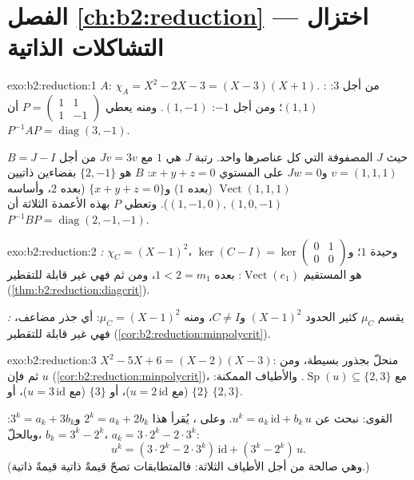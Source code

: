 \section*{الفصل \ref{ch:b2:reduction} --- اختزال التشاكلات الذاتية}

\begin{solution}{exo:b2:reduction:1}
$A$: $\chi_A = X^2 - 2X - 3 = (X - 3)(X + 1)$. : من أجل
$3$: $(1,1)$؛ ومن أجل $-1$: $(1,-1)$. ومنه يعطي $P = \begin{pmatrix} 1 & 1\\ 1
& -1\end{pmatrix}$ أن $P^{-1}AP = \operatorname{diag}(3, -1)$.

$B = J - I$ حيث $J$ المصفوفة التي كل عناصرها واحد. رتبة $J$ هي $1$ مع
$Jv = 3v$ من أجل $v = (1,1,1)$ و$Jw = 0$ على المستوي $x + y + z =
0$:  $B$ هو $\{2, -1\}$ بفضاءين ذاتيين
$\operatorname{Vect}(1,1,1)$ (بعده $1$) و$\{x + y + z = 0\}$
(بعده $2$، وأساسه $(1,-1,0), (1,0,-1)$). وتعطي $P$ بهذه الأعمدة
الثلاثة أن $P^{-1}BP = \operatorname{diag}(2, -1, -1)$.
\end{solution}

\begin{solution}{exo:b2:reduction:2}
\emph{:} $\chi_C = (X-1)^2$،  وحيدة $1$؛
و$\ker(C - I) = \ker\begin{pmatrix} 0&1\\ 0&0\end{pmatrix}$ هو
المستقيم $\operatorname{Vect}(e_1)$: بعده $1 < 2 = m_1$، ومن ثم فهي غير
قابلة للتقطير (\cref{thm:b2:reduction:diagcrit}).

\emph{:} يقسم $\mu_C$ كثير الحدود $(X-1)^2$ و$C \neq I$،
ومنه $\mu_C = (X-1)^2$: أي جذر مضاعف، فهي غير قابلة للتقطير
(\cref{cor:b2:reduction:minpolycrit}).
\end{solution}

\begin{solution}{exo:b2:reduction:3}
$X^2 - 5X + 6 = (X-2)(X-3)$: منحلّ بجذور بسيطة، ومن ثم فإن $u$
 (\cref{cor:b2:reduction:minpolycrit})، مع
$\operatorname{Sp}(u) \subseteq \{2, 3\}$. والأطياف الممكنة:
$\{2\}$ (مع $u = 2\,\mathrm{id}$)، أو $\{3\}$ (مع $u = 3\,\mathrm{id}$)، أو
$\{2, 3\}$.

القوى: نبحث عن $u^k = a_k\,\mathrm{id} + b_k\,u$. وعلى ،
يُقرأ هذا $2^k = a_k + 2b_k$ و$3^k = a_k + 3b_k$: وبالحلّ، $b_k
= 3^k - 2^k$، $a_k = 3\cdot2^k - 2\cdot 3^k$:
\[
u^k = (3\cdot 2^k - 2\cdot 3^k)\,\mathrm{id} + (3^k - 2^k)\, u .
\]
(وهي صالحة من أجل الأطياف الثلاثة: فالمتطابقات تصحّ قيمةً ذاتية قيمةً ذاتية.)
\end{solution}

